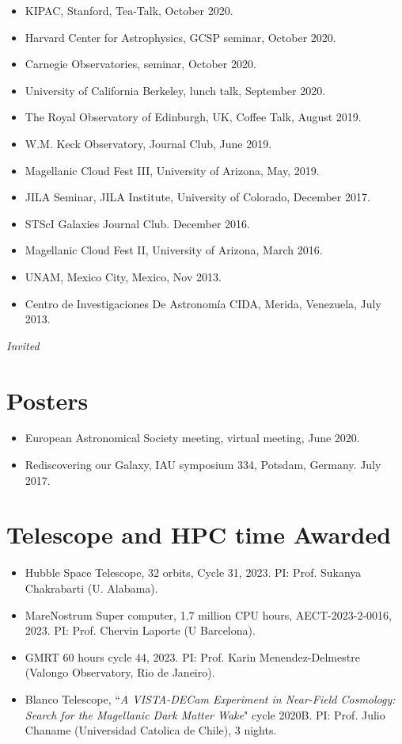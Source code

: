 \documentclass[14pt]{article}
\begin{document}
\begin{itemize}
\item KIPAC, Stanford, Tea-Talk, October 2020.
\item Harvard Center for Astrophysics, GCSP seminar, October 2020.
\item Carnegie Observatories, seminar, October 2020. \dag
\item University of California Berkeley, lunch talk, September 2020. 
\item The Royal Observatory of Edinburgh, UK, Coffee Talk, August 2019. \dag
\item W.M. Keck Observatory, Journal Club, June 2019.
\item Magellanic Cloud Fest III, University of Arizona, May, 2019.
\item JILA Seminar, JILA Institute, University of Colorado, December 2017.
\item STScI Galaxies Journal Club. December 2016.
\item Magellanic Cloud Fest II, University of Arizona, March 2016.
\item UNAM, Mexico City, Mexico, Nov 2013. 
\item Centro de Investigaciones De Astronom\'ia CIDA, Merida, Venezuela, July 2013.
\end{itemize}
\indent \dag \textit{Invited}

\section*{Posters}
\begin{itemize}
\setlength\itemsep{0.0em}
\renewcommand\labelitemi{$\cdot$}
  \item European Astronomical Society meeting, virtual meeting, June 2020.
  \item Rediscovering our Galaxy, IAU symposium 334, Potsdam, Germany. July 2017.
\end{itemize}

\section*{Telescope and HPC time Awarded}
\begin{itemize}
  \setlength\itemsep{0.0em}
  \renewcommand\labelitemi{$\cdot$}
\item Hubble Space Telescope, 32 orbits, Cycle 31, 2023. PI: Prof. Sukanya Chakrabarti (U. Alabama). 
\item MareNostrum Super computer, 1.7 million CPU hours, AECT-2023-2-0016, 2023.
  PI: Prof. Chervin Laporte (U Barcelona). 
\item GMRT 60 hours cycle 44, 2023. PI: Prof. Karin Menendez-Delmestre (Valongo Observatory, Rio de Janeiro).
\item Blanco Telescope, ``\textit{A VISTA-DECam Experiment in Near-Field
  Cosmology: Search for the Magellanic Dark Matter Wake}" cycle 2020B. PI: Prof. Julio
  Chaname (Universidad Catolica de Chile), 3 nights.
\end{itemize}
\end{document}
